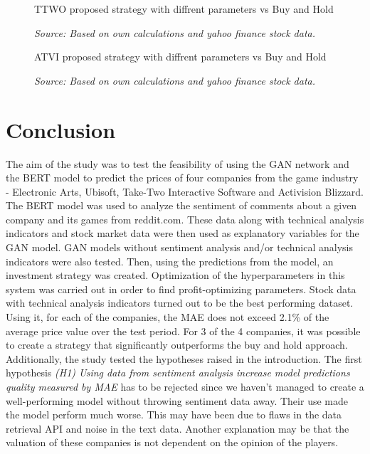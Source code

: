 \documentclass[11pt]{article} %
\begin{document}
\begin{figure}[H]
\caption{TTWO proposed strategy with diffrent parameters vs Buy and Hold}
\begin{adjustbox}{width=1.3\textwidth,center}

\end{adjustbox}
\caption*{\textit{Source: Based on own calculations and yahoo finance stock data.}}
\end{figure}

\begin{figure}[H]
\caption{ATVI proposed strategy with diffrent parameters vs Buy and Hold}
\begin{adjustbox}{width=1.3\textwidth,center}

\end{adjustbox}
\caption*{\textit{Source: Based on own calculations and yahoo finance stock data.}}
\end{figure}



\section{Conclusion}

The aim of the study was to test the feasibility of using the GAN network and the BERT model to predict the prices of four companies from the game industry -  Electronic Arts, Ubisoft, Take-Two Interactive Software and Activision Blizzard. The BERT model was used to analyze the sentiment of comments about a given company and its games from reddit.com. These data along with technical analysis indicators and stock market data were then used as explanatory variables for the GAN model. GAN models without sentiment analysis and/or technical analysis indicators were also tested. Then, using the predictions from the model, an investment strategy was created. Optimization of the hyperparameters in this system was carried out in order to find profit-optimizing parameters. Stock data with technical analysis indicators turned out to be the best performing dataset. Using it, for each of the companies, the MAE does not exceed 2.1\% of the average price value over the test period. For 3 of the 4 companies, it was possible to create a strategy that significantly outperforms the buy and hold approach. \\

Additionally, the study tested the hypotheses raised in the introduction. The first hypothesis \textit{(H1) Using data from sentiment analysis increase model predictions quality measured by MAE} has to be rejected since we haven't managed to create a well-performing model without throwing sentiment data away. Their use made the model perform much worse. This may have been due to flaws in the data retrieval API and noise in the text data. Another explanation may be that the valuation of these companies is not dependent on the opinion of the players. \\
\end{document}
